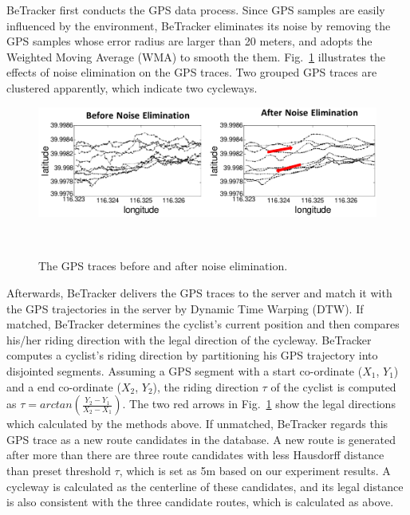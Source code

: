 \documentclass{sigchi-ext}
\def\sysname{BeTracker }
\begin{document}
\sysname first conducts the GPS data process. Since GPS samples are easily influenced by the environment, \sysname eliminates its noise by removing the GPS samples whose error radius are larger than 20 meters, and adopts the Weighted Moving Average (WMA) to smooth the them.  Fig.~\ref{fig:gps_trace} illustrates the effects of noise elimination on the GPS traces. Two grouped GPS traces are clustered apparently, which indicate two cycleways. 



\begin{figure}[h]
	\includegraphics[width=1\columnwidth]{figures/GPS_trace1.pdf}
	\caption{The GPS traces before and after noise elimination.}~\label{fig:gps_trace}
\end{figure}

Afterwards, \sysname delivers the GPS traces to the server and match it with the GPS trajectories in the server by Dynamic Time Warping (DTW). If matched, \sysname determines the cyclist's current position and then compares his/her riding direction with the legal direction of the cycleway.  \sysname computes a cyclist's riding direction by partitioning his GPS trajectory into disjointed segments. Assuming a GPS segment with a start co-ordinate ($X_{1}$, $Y_{1}$) and a end co-ordinate ($X_{2}$, $Y_{2}$), the riding direction $\tau$ of the cyclist is computed as $\tau=arctan(\frac{Y_{2}-Y_{1}}{X_{2}-X_{1}})$.  The two red arrows in Fig.~\ref{fig:gps_trace} show the legal directions which calculated by the methods above.  
If unmatched, \sysname regards this GPS trace as a new route candidates in the database. A new route is generated after more than there are three route candidates with less Hausdorff distance \cite{bib:Hausdorff1994} than preset threshold $\tau$, which is set as 5m based on our experiment results. A cycleway is calculated as the centerline of these candidates, and its legal distance is also consistent with the three candidate routes, which is calculated as above.  
\end{document}
